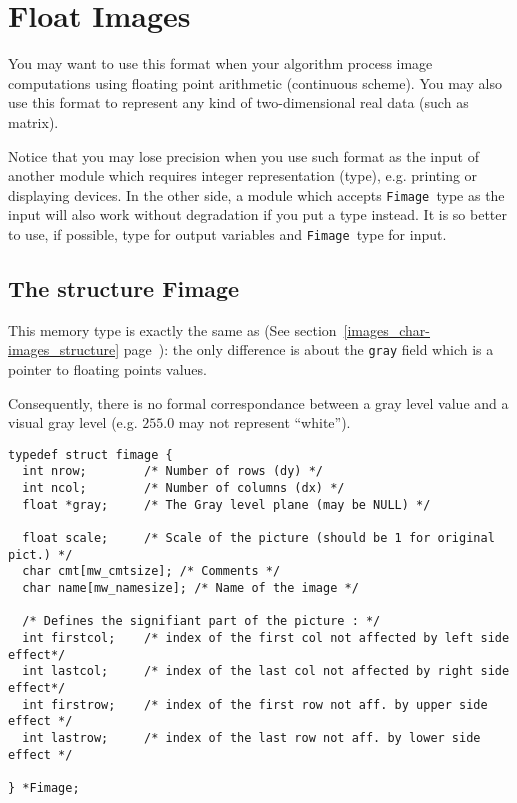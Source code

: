 \newpage %



\section{Float Images}

\label{images_float-images}
\def\fimage{{\tt Fimage }}
\index{structure!\fimage}

You may want to use this format when your algorithm process image computations
using floating point arithmetic (continuous scheme). 
You may also use this format to represent any kind of two-dimensional real data (such as matrix).

Notice that you may lose precision when you use such format as the input
of another module which requires integer representation (\cimage type), e.g.
printing or displaying devices.
In the other side, a module which accepts \fimage type as the input will also
work without degradation if you put a \cimage type instead.
It is so better to use, if possible, \cimage type for output variables and \fimage type for input.

\subsection{The structure Fimage}
\label{images_float-images_structure}

 This memory type is exactly the same as \cimage (See section~\ref{images_char-images_structure} page~\pageref{images_char-images_structure}): the only difference is about the \verb+gray+ field which is a pointer to floating points values.

Consequently, there is no formal correspondance between a gray level value
and a visual gray level (e.g. $255.0$ may not represent ``white'').

{\small
\begin{verbatim}
typedef struct fimage {
  int nrow;        /* Number of rows (dy) */
  int ncol;        /* Number of columns (dx) */
  float *gray;     /* The Gray level plane (may be NULL) */

  float scale;     /* Scale of the picture (should be 1 for original pict.) */
  char cmt[mw_cmtsize]; /* Comments */
  char name[mw_namesize]; /* Name of the image */
  
  /* Defines the signifiant part of the picture : */
  int firstcol;    /* index of the first col not affected by left side effect*/
  int lastcol;     /* index of the last col not affected by right side effect*/
  int firstrow;    /* index of the first row not aff. by upper side effect */  
  int lastrow;     /* index of the last row not aff. by lower side effect */  

} *Fimage;
\end{verbatim}
}

